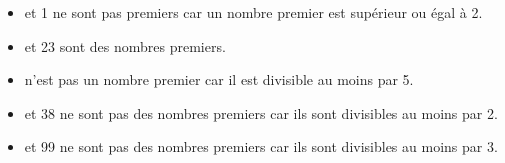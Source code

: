    \begin{itemize}
      \item { et 1} ne sont pas premiers car un nombre premier est supérieur ou égal à 2.
      \item { et 23} sont des nombres premiers.
      \item {} n'est pas un nombre premier car il est divisible au moins par 5.
      \item { et 38} ne sont pas des nombres premiers car ils sont divisibles au moins par 2.
      \item { et 99} ne sont pas des nombres premiers car ils sont divisibles au moins par 3.
   \end{itemize}
